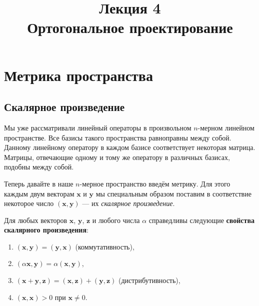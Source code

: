\documentclass[11pt,a4paper]{article}
\title{Лекция 4 \\
    Ортогональное проектирование
    }
\providecommand{\tightlist}{%
      \setlength{\itemsep}{0pt}\setlength{\parskip}{0pt}}
\begin{document}
    
    \maketitle
    
    
    \hypertarget{ux43cux435ux442ux440ux438ux43aux430-ux43fux440ux43eux441ux442ux440ux430ux43dux441ux442ux432ux430}{%
\section{Метрика
пространства}\label{ux43cux435ux442ux440ux438ux43aux430-ux43fux440ux43eux441ux442ux440ux430ux43dux441ux442ux432ux430}}

\hypertarget{ux441ux43aux430ux43bux44fux440ux43dux43eux435-ux43fux440ux43eux438ux437ux432ux435ux434ux435ux43dux438ux435}{%
\subsection{Скалярное
произведение}\label{ux441ux43aux430ux43bux44fux440ux43dux43eux435-ux43fux440ux43eux438ux437ux432ux435ux434ux435ux43dux438ux435}}

Мы уже рассматривали линейный операторы в произвольном \(n\)-мерном
линейном пространстве. Все базисы такого пространства равноправны между
собой. Данному линейному оператору в каждом базисе соответствует
некоторая матрица. Матрицы, отвечающие одному и тому же оператору в
различных базисах, подобны между собой.

Теперь давайте в наше \(n\)-мерное пространство введём метрику. Для
этого каждым двум векторам \(\mathbf{x}\) и \(\mathbf{y}\) мы
специальным образом поставим в соответствие некоторое число
\((\mathbf{x}, \mathbf{y})\) --- их \emph{скалярное произведение}.

Для любых векторов \(\mathbf{x}\), \(\mathbf{y}\), \(\mathbf{z}\) и
любого числа \(\alpha\) справедливы следующие \textbf{свойства
скалярного произведения}:

\begin{enumerate}
\def\labelenumi{\arabic{enumi}.}
\tightlist
\item
  \((\mathbf{x}, \mathbf{y}) = (\mathbf{y}, \mathbf{x})\)
  (коммутативность),
\item
  \((\alpha \mathbf{x}, \mathbf{y}) = \alpha (\mathbf{x}, \mathbf{y})\),
\item
  \((\mathbf{x} + \mathbf{y}, \mathbf{z}) = (\mathbf{x}, \mathbf{z}) + (\mathbf{y}, \mathbf{z})\)
  (дистрибутивность),
\item
  \((\mathbf{x}, \mathbf{x}) > 0\) при \(\mathbf{x} \ne 0\).
\end{enumerate}
\end{document}
